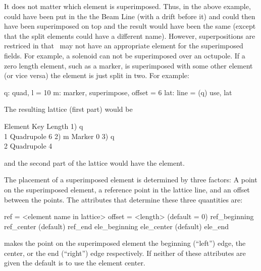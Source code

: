 It does not matter which element is superimposed. Thus, in the above example,  could have 
been put in the the Beam Line (with a drift before it) and  could then have been superimposed on 
top and the result would have been the same (except that the split elements could have a different
name). However,
superpositions are restriced in that \bmad\ may not have an appropriate element for the
superimposed fields. For example, a solenoid can not be superimposed over an octupole. 
If a zero length element, such as a marker, is superimposed with some other element (or vice versa)
the element is just split in two. For example:
\begin{example}
  q: quad, l = 10
  m: marker, superimpose, offset = 6
  lat: line = (q)
  use, lat
\end{example}
The resulting lattice (first part) would be
\begin{example}
        Element   Key           Length
  1)    q\\1       Quadrupole    6
  2)    m         Marker        0
  3)    q\\2       Quadrupole    4
\end{example}
and the second part of the lattice would have the  element.
 
The placement of a superimposed element is determined by three factors: A point on the 
superimposed element, a reference point in the lattice line, and an offset between the
points. The attributes that determine these three quantities are:
\begin{example}
  ref = <element name in lattice>
  offset = <length>      (default = 0)
  ref_beginning
  ref_center             (default)
  ref_end
  ele_beginning
  ele_center             (default)
  ele_end
\end{example}
   makes the point on the superimposed element 
the beginning (``left'') edge, the center, or the end (``right'') edge respectively.
If neither of these attributes are given the default is to use the element center.



